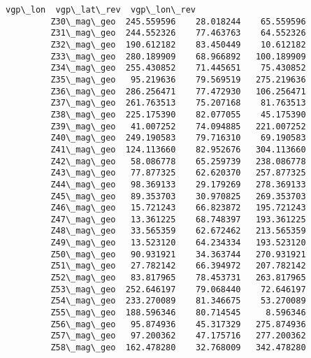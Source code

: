 \documentclass[11pt]{article}
\begin{document}
\begin{Verbatim}[commandchars=\\\{\}]
                         vgp\_lon  vgp\_lat\_rev  vgp\_lon\_rev  
         Z30\_mag\_geo  245.559596    28.018244    65.559596  
         Z31\_mag\_geo  244.552326    77.463763    64.552326  
         Z32\_mag\_geo  190.612182    83.450449    10.612182  
         Z33\_mag\_geo  280.189909    68.966892   100.189909  
         Z34\_mag\_geo  255.430852    71.445651    75.430852  
         Z35\_mag\_geo   95.219636    79.569519   275.219636  
         Z36\_mag\_geo  286.256471    77.472930   106.256471  
         Z37\_mag\_geo  261.763513    75.207168    81.763513  
         Z38\_mag\_geo  225.175390    82.077055    45.175390  
         Z39\_mag\_geo   41.007252    74.094885   221.007252  
         Z40\_mag\_geo  249.190583    79.716310    69.190583  
         Z41\_mag\_geo  124.113660    82.952676   304.113660  
         Z42\_mag\_geo   58.086778    65.259739   238.086778  
         Z43\_mag\_geo   77.877325    62.620370   257.877325  
         Z44\_mag\_geo   98.369133    29.179269   278.369133  
         Z45\_mag\_geo   89.353703    30.970825   269.353703  
         Z46\_mag\_geo   15.721243    66.823872   195.721243  
         Z47\_mag\_geo   13.361225    68.748397   193.361225  
         Z48\_mag\_geo   33.565359    62.672462   213.565359  
         Z49\_mag\_geo   13.523120    64.234334   193.523120  
         Z50\_mag\_geo   90.931921    34.363744   270.931921  
         Z51\_mag\_geo   27.782142    66.394972   207.782142  
         Z52\_mag\_geo   83.817965    78.453731   263.817965  
         Z53\_mag\_geo  252.646197    79.068440    72.646197  
         Z54\_mag\_geo  233.270089    81.346675    53.270089  
         Z55\_mag\_geo  188.596346    80.714545     8.596346  
         Z56\_mag\_geo   95.874936    45.317329   275.874936  
         Z57\_mag\_geo   97.200362    47.175716   277.200362  
         Z58\_mag\_geo  162.478280    32.768009   342.478280  
\end{Verbatim}
        

    \begin{center}
    \end{center}
    { \hspace*{\fill} \\}
    

    \begin{center}
    \end{center}
    { \hspace*{\fill} \\}
    
\end{document}
